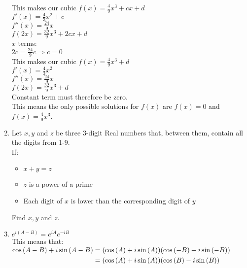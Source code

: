 \documentclass[../main.tex]{subfiles}
\begin{document}
\begin{enumerate}
    This makes our cubic \(f(x)=\frac{4}{9}x^3+cx+d\)\\

    \(f'(x)=\frac{4}{3}x^2+c\)\\
    \(f''(x)=\frac{24}{9}x\)\\
    \(f(2x)=\frac{32}{9}x^3+2cx+d\)\\

    \(x\) terms:\\
    \(2c=\frac{24}{9}c \Rightarrow c=0\)\\
    
    This makes our cubic \(f(x)=\frac{4}{9}x^3+d\)\\

    \(f'(x)=\frac{4}{3}x^2\)\\
    \(f''(x)=\frac{24}{9}x\)\\
    \(f(2x)=\frac{32}{9}x^3+d\)\\

    Constant term must therefore be zero.\\

    This means the only possible solutions for \(f(x)\) are \(f(x)=0\) and \(f(x)=\frac{4}{9}x^3\).\\
    
    \item 
    
    Let \(x, y \text{ and } z\) be three 3-digit Real numbers that, between them, contain all the digits from 1-9.\\
    If:
    \begin{itemize}
        \item 
            \(x+y=z\)
        \item 
            \(z\) is a power of a prime
        \item 
            Each digit of \(x\) is lower than the corresponding digit of \(y\)
    \end{itemize}
    Find \(x, y\) and \(z\).\\

    \item
    \(e^{i(A-B)}=e^{iA}e^{-iB}\)\\
    This means that:\\
    $
    \!
    \begin{aligned}[t]
    \cos{(A-B)+i\sin{(A-B)}}
    &=(\cos{(A)+i\sin{(A)}})(\cos{(-B)+i\sin{(-B)}})\\
    &=(\cos{(A)+i\sin{(A)}})(\cos{(B)-i\sin{(B)}})
    \end{aligned}\\
    $
    

\end{enumerate}
\end{document}
